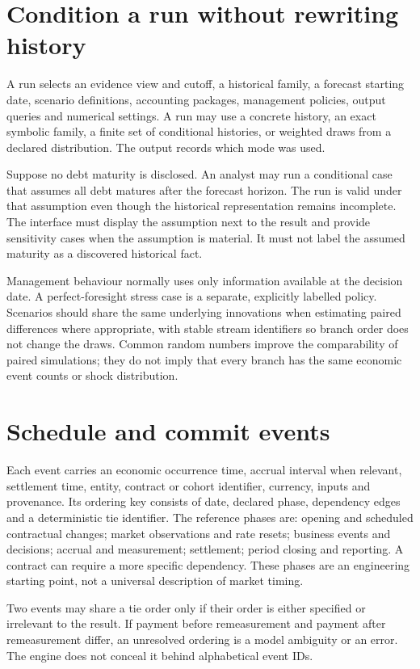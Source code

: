 \section{Condition a run without rewriting history}

A run selects an evidence view and cutoff, a historical family, a forecast
starting date, scenario definitions, accounting packages, management policies,
output queries and numerical settings. A run may use a concrete history,
an exact symbolic family, a finite set of conditional histories, or weighted
draws from a declared distribution. The output records which mode was used.

Suppose no debt maturity is disclosed. An analyst may run a conditional case
that assumes all debt matures after the forecast horizon. The run is valid
under that assumption even though the historical representation remains
incomplete. The interface must display the assumption next to the result and
provide sensitivity cases when the assumption is material. It must not label
the assumed maturity as a discovered historical fact.

Management behaviour normally uses only information available at the decision
date. A perfect-foresight stress case is a separate, explicitly labelled
policy. Scenarios should share the same underlying innovations when estimating
paired differences where appropriate, with stable stream identifiers so
branch order does not change the draws. Common random numbers improve the
comparability of paired simulations; they do not imply that every branch has
the same economic event counts or shock distribution.

\section{Schedule and commit events}

Each event carries an economic occurrence time, accrual interval when relevant,
settlement time, entity, contract or cohort identifier, currency, inputs and
provenance. Its ordering key consists of date, declared phase, dependency edges
and a deterministic tie identifier. The reference phases are: opening and
scheduled contractual changes; market observations and rate resets; business
events and decisions; accrual and measurement; settlement; period closing and
reporting. A contract can require a more specific dependency. These phases are
an engineering starting point, not a universal description of market timing.

Two events may share a tie order only if their order is either specified or
irrelevant to the result. If payment before remeasurement and payment after
remeasurement differ, an unresolved ordering is a model ambiguity or an error.
The engine does not conceal it behind alphabetical event IDs.

